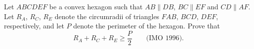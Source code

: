 Let $ABCDEF$ be a convex hexagon such that $AB \parallel DB$, $BC \parallel EF$ and $CD \parallel AF$. Let $R_A$, $R_C$, $R_E$ denote the circumradii of triangles $FAB$, $BCD$, $DEF$, respectively, and let $P$ denote the perimeter of the hexagon. Prove that
\[ R_A + R_C + R_E \geq \frac{P}{2} \qquad \text{(IMO 1996).} \]
